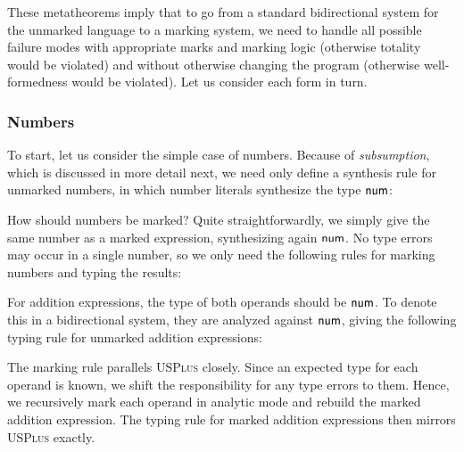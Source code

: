 These metatheorems imply that to go from a standard bidirectional system for the unmarked language to a marking system, we need to handle all possible failure modes with appropriate marks and marking logic (otherwise totality would be violated) and without otherwise changing the program (otherwise well-formedness would be violated).
Let us consider each form in turn. 

\subsubsection{Numbers}
\label{sec:calculus-numbers}

To start, let us consider the simple case of numbers. Because of \emph{subsumption}, which is
discussed in more detail next, we need only define a synthesis rule for unmarked numbers, in which
number literals synthesize the type $\TNum$:
%
\begin{mathpar}
\end{mathpar}

How should numbers be marked? Quite straightforwardly, we simply give the same number as a marked
expression, synthesizing again $\TNum$. No type errors may occur in a single number, so we only need
the following rules for marking numbers and typing the results: 
%
\begin{mathpar}

\end{mathpar}

For addition expressions, the type of both operands should be $\TNum$. To denote this in a
bidirectional system, they are analyzed against $\TNum$, giving the following typing rule for
unmarked addition expressions:
%
\begin{mathpar}
\end{mathpar}

The marking rule parallels \textsc{USPlus} closely. Since an expected type for each operand is known,
we shift the responsibility for any type errors to them. Hence, we recursively mark each operand in
analytic mode and rebuild the marked addition expression. The typing rule for marked addition
expressions then mirrors \textsc{USPlus} exactly.
%
\begin{mathpar}

\end{mathpar}

